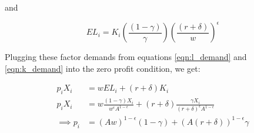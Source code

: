 \documentclass[letterpaper,12pt]{article}
\theoremstyle{definition}
\begin{document}
\begin{spacing}{1.5}
and

\begin{equation}
\label{eqn:l_demand2}
EL_{i} =K_{i}\left(\frac{(1-\gamma)}{\gamma}\right)\left(\frac{(r+\delta)}{w}\right)^{\epsilon}
\end{equation}


Plugging these factor demands from equations \ref{eqn:l_demand} and \ref{eqn:k_demand} into the zero profit condition, we get:

\begin{equation}
\label{eqn:prices}
\begin{split}
p_{i}X_{i} &= w EL_{i} + (r+\delta)K_{i} \\
p_{i}X_{i} &= w \frac{(1-\gamma)X_{i}}{w^{\epsilon}A^{1-\epsilon}} + (r+\delta)\frac{\gamma X_{i}}{(r+\delta)^{\epsilon}A^{1-\epsilon}} \\
\implies p_{i} & = (Aw)^{1-\epsilon}(1-\gamma) + (A(r+\delta))^{1-\epsilon} \gamma
\end{split}
\end{equation}


%
%
%
%
%
%


\end{spacing}
\end{document}
